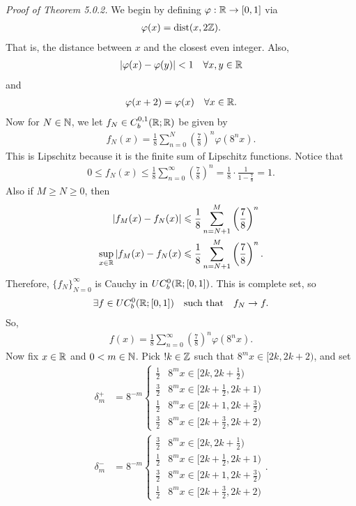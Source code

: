 \documentclass{report}
\begin{document}
\noindent\textit{Proof of Theorem 5.0.2.} We begin by defining $\varphi: \RR \to [0, 1]$ via 
\begin{align*}
    \varphi(x) = \mathrm{dist}(x, 2\ZZ).
\end{align*}
That is, the distance between $x$ and the closest even integer. Also,
\begin{align}
    |\varphi(x) - \varphi(y)| < 1 \quad \forall x,y\in \RR
\end{align}
and 
\begin{align}
    \varphi(x+2) = \varphi(x) \quad \forall x \in \RR.
\end{align}
Now for $N \in \NN$, we let $f_N \in C_b^{0, 1}(\RR ; \RR)$ be given by 
\begin{align*}
    f_N(x) = \frac 18 \sum_{n=0}^N \left( \frac 78 \right)^n \varphi(8^n x).
\end{align*}
This is Lipschitz because it is the finite sum of Lipschitz functions. Notice that 
\begin{align*}
    0 \leq f_N(x) \leq \frac 18 \sum_{n=0}^\infty \left( \frac 78 \right)^n = \frac 18 \cdot \frac{1}{1 - \frac 78} = 1.
\end{align*}
Also if $M \geq N \geq 0$, then 
\begin{align*}
    |f_M(x) - f_N(x)| &\leq \frac 18 \sum_{n=N + 1}^M \left( \frac 78\right)^n \\
    \sup_{x \in \RR} |f_M(x) - f_N(x) &\leq \frac 18 \sum_{n=N + 1}^M \left( \frac 78\right)^n.
\end{align*}
Therefore, $\{f_N\}_{N=0}^\infty$ is Cauchy in $UC_b^0(\RR; [0, 1])$. This is complete set, so 
\begin{align*}
    \exists f \in UC_b^0(\RR; [0, 1]) \quad \text{such that} \quad f_N \to f.
\end{align*}
So,
\begin{align*}
    f(x) = \frac 18 \sum_{n=0}^\infty \left(\frac 78 \right)^n \varphi(8^n x).
\end{align*}
Now fix $x \in \RR$ and $0 < m \in \NN$. Pick $!k \in \ZZ$ such that $8^mx \in [2k, 2k + 2)$, and set 
\begin{align*}
    \delta^+_m&= 8^{-m}\begin{cases}
    \frac 12 & 8^m x \in [2k, 2k + \frac 12) \\
    \frac 32 & 8^m x \in [2k + \frac 12, 2k +1) \\
    \frac 12 & 8^m x \in [2k + 1, 2k + \frac 32) \\
    \frac 32 & 8^m x \in [2k + \frac 32, 2k + 2)
    \end{cases} \\
    \delta^-_m&= 8^{-m}\begin{cases}
        \frac 32 & 8^m x \in [2k, 2k + \frac 12) \\
        \frac 12 & 8^m x \in [2k + \frac 12, 2k +1) \\
        \frac 32 & 8^m x \in [2k + 1, 2k + \frac 32) \\
        \frac 12 & 8^m x \in [2k + \frac 32, 2k + 2)
    \end{cases}.
\end{align*}
\end{document}
